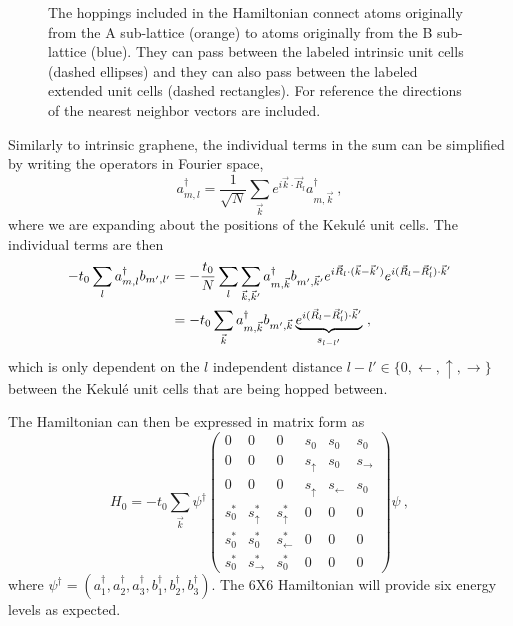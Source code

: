 \begin{figure}
	\begin{center}
	
	\end{center}
	\caption[Diagram of the hoppings in the expanded Kekul\'e unit cell]{\label{fig:kek:hoppings}
		The hoppings included in the Hamiltonian connect atoms originally from the A sub-lattice (orange) to atoms originally from the B sub-lattice (blue).
		They can pass between the labeled intrinsic unit cells (dashed ellipses) and they can also pass between the labeled extended unit cells (dashed rectangles).
		For reference the directions of the nearest neighbor vectors are included.
	}
\end{figure}

Similarly to intrinsic graphene, the individual terms in the sum can be simplified by writing the operators in Fourier space,
\begin{equation}
	a_{m,l}^{\dagger}=\frac{1}{\sqrt{N}}\sum_{\vec{k}} e^{ i \vec{k}  \cdot \vec{R}_l} a_{m,\vec{k} }^{\dagger} \ ,
	\label{eq:kek:FT}
\end{equation}
where we are expanding about the positions of the Kekul\'e unit cells.
The individual terms are then
\begin{align*}
	-t_0 \sum_l a^{\dagger}_{m,l} b_{m',l'} &=
	    -\frac{t_0}{N}\sum_l \sum_{\vec{k},\vec{k}'} a^{\dagger}_{m,\vec{k}} b_{m',\vec{k}'} 
	    e^{i \vec{R}_l \cdot (\vec{k}-\vec{k}')} e^{i(\vec{R}_l-\vec{R}_l')\cdot \vec{k}'} \\
	    &= -t_0 \sum_{\vec{k}} a^{\dagger}_{m,\vec{k}} b_{m',\vec{k}} \underbrace{e^{i(\vec{R}_l-\vec{R}_l')\cdot \vec{k}'}}_{s_{l-l'}} \ ,
\end{align*}
which is only dependent on the $l$ independent distance $l-l' \in \{ 0,\leftarrow,\uparrow,\rightarrow \}$ between the Kekul\'e unit cells that are being hopped between.

The Hamiltonian can then be expressed in matrix form as
\begin{equation}
	H_0=-t_0 \sum_{\vec{k}} \psi^{\dagger} 
	\left(\begin{array}{cccccc}
		0     & 0                 & 0                & s_0          & s_0            & s_0 \\
		0     & 0                 & 0                & s_{\uparrow} & s_0            & s_{\rightarrow} \\
		0     & 0                 & 0                & s_{\uparrow} & s_{\leftarrow} & s_0 \\
		s_0^* & s_{\uparrow}^*    & s_{\uparrow}^*   & 0            & 0              & 0 \\
		s_0^* & s_0^*             & s_{\leftarrow}^* & 0            & 0              & 0 \\
		s_0^* & s_{\rightarrow}^* & s_0^*            & 0            & 0              & 0 
	\end{array}\right)
	\psi \ ,
	\label{eq:kek:Hzonefold}
\end{equation}
where $\psi^{\dagger}=\left( a^{\dagger}_1, a^{\dagger}_2, a^{\dagger}_3, b^{\dagger}_1, b^{\dagger}_2, b^{\dagger}_3 \right)$.
The 6X6 Hamiltonian will provide six energy levels as expected.

